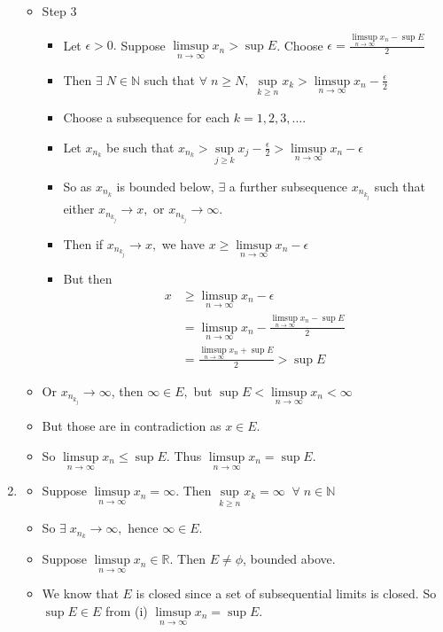\documentclass[12pt]{article}
\begin{document}
\begin{enumerate}[label=(\roman*)]
\begin{itemize}
        \item Step 3
        \begin{itemize}
            \item Let $\epsilon >0.$ Suppose $\limsup\limits_{n\to\infty} x_n > \sup E$. Choose $\epsilon=\frac{\limsup\limits_{n\to\infty} x_n - \sup E}{2}$
            \item Then $\exists\; N\in\mathbb{N}$ such that $\forall\;n\ge N,\;\sup\limits_{k\ge n}x_k > \limsup\limits_{n\to\infty} x_n - \frac{\epsilon}{2}$
            \item Choose a subsequence for each $k=1,2,3,\ldots$.
            \item Let $x_{n_k}$ be such that $x_{n_k} > \sup\limits_{j\ge k} x_j - \frac{\epsilon}{2} > \limsup\limits_{n\to\infty} x_n -\epsilon$
            \item So as $x_{n_k}$ is bounded below, $\exists$ a further subsequence $x_{n_{k_j}}$ such that either $x_{n_{k_j}}\to x,$ or $x_{n_{k_j}}\to \infty$.
            \item Then if $x_{n_{k_j}}\to x,$ we have $x\ge \limsup\limits_{n\to\infty} x_n - \epsilon$
            \item But then 
            \begin{align}
                x&\ge \limsup\limits_{n\to\infty} x_n - \epsilon \nonumber \\
                &=\limsup\limits_{n\to\infty} x_n - \frac{\limsup\limits_{n\to\infty} x_n - \sup E}{2}\nonumber \\ 
                &=\frac{\limsup\limits_{n\to\infty} x_n +\sup E}{2} > \sup E \nonumber            \end{align}
        
        \end{itemize}
        \item Or $x_{n_{k_j}} \to \infty$, then $\infty\in E,$ but $\sup E<\limsup\limits_{n\to\infty} x_n <\infty$
        \item But those are in contradiction as $x\in E$.
        \item So $\limsup\limits_{n\to\infty} x_n \le \sup E$. Thus $\limsup\limits_{n\to\infty} x_n = \sup E$.
    \end{itemize}

    \item 
        \begin{itemize}
            \item Suppose $\limsup\limits_{n\to\infty} x_n = \infty$. Then $\sup\limits_{k\ge n} x_k = \infty\;\;\forall\;n\in\mathbb{N}$
            \item So $\exists\; x_{n_k}\to \infty,$ hence $\infty\in E$.
            \item Suppose $\limsup\limits_{n\to\infty} x_n \in\mathbb{R}$. Then $E\neq \phi$, bounded above.
            \item We know that $E$ is closed since  a set of subsequential limits is closed. So $\sup E\in E$ from (i) $\limsup\limits_{n\to\infty} x_n = \sup E$.\\
            

\end{itemize}
\end{enumerate}
\end{document}
